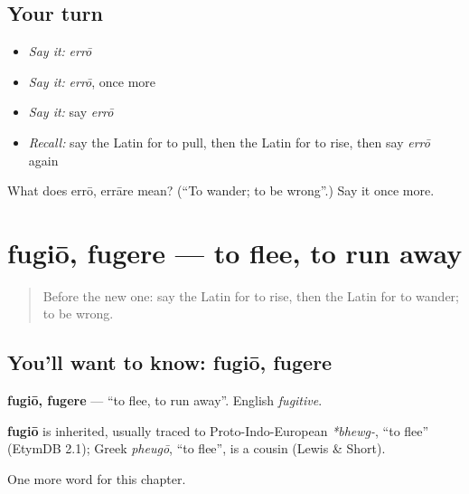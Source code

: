 \subsection*{Your turn}
\begin{itemize}
\raggedright
  \item \emph{Say it:} \emph{errō}
  \item \emph{Say it:} \emph{errō}, once more
  \item \emph{Say it:} say \emph{errō}
  \item \emph{Recall:} say the Latin for to pull, then the Latin for to rise, then say \emph{errō} again
\end{itemize}

\begin{tcolorbox}[breakable,colback=teal!4,colframe=teal!35!black,title={Before you move on}]
What does errō, errāre mean? (\textquotedblleft{}To wander; to be wrong\textquotedblright{}.) Say it once more.
\end{tcolorbox}
\section[fugiō, fugere]{fugiō, fugere — to flee, to run away}

\label{lesson:LA-C101-fugio}



\begin{quote}
Before the new one: say the Latin for to rise, then the Latin for to wander; to be wrong.
\end{quote}

\subsection*{You'll want to know: fugiō, fugere}
\textbf{fugiō, fugere} — \textquotedblleft{}to flee, to run away\textquotedblright{}. English \emph{fugitive}.

\begin{cousinweb}
\textbf{fugiō} is inherited, usually traced to Proto-Indo-European \emph{*bhewg-}, \textquotedblleft{}to flee\textquotedblright{} (EtymDB 2.1); Greek \emph{pheugō}, \textquotedblleft{}to flee\textquotedblright{}, is a cousin (Lewis \& Short).
\end{cousinweb}

\begin{grammarlens}[title={What you've built}]
One more word for this chapter.
\end{grammarlens}

